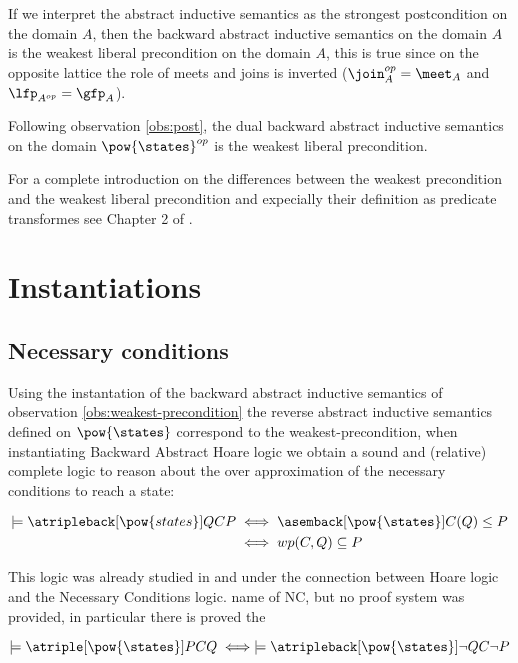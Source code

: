 If we interpret the abstract inductive semantics as the strongest postcondition
on the domain $A$, then the backward abstract inductive semantics on the domain 
$A$ is the weakest liberal precondition on the domain $A$, this is true since on 
the opposite lattice the role of meets and joins is inverted ($\join_A^{op} = 
\meet_A$ and $\lfp_{A^{op}} = \gfp_A$).

\begin{observation}
  \label{obs:weakest-liberal-precondition}
  Following observation \ref{obs:post}, the dual backward 
  abstract inductive semantics on the domain $\pow{\states}^{op}$ is the weakest 
  liberal precondition.
\end{observation}

For a complete introduction on the differences between the weakest precondition
and the weakest liberal precondition and expecially their definition as
predicate transformes see Chapter 2 of \cite{Kaminski19}.

\section{Instantiations}

\subsection{Necessary conditions}

Using the instantation of the backward abstract inductive semantics of 
observation \ref{obs:weakest-precondition} the reverse abstract inductive semantics
defined on $\pow{\states}$ correspond to the weakest-precondition, when 
instantiating Backward Abstract Hoare logic we obtain a sound and (relative) 
complete logic to reason about the over approximation of the necessary 
conditions to reach a state:

\begin{align*}
  \models \atripleback[\pow{states}]{Q}{C}{P} 
    & \iff \asemback[\pow{\states}]{C}(Q) \leq P \\
    & \iff wp(C, Q) \subseteq P
\end{align*}

This logic was already studied in \cite{Zhang22} and \cite{Ascari24} under the 
connection between Hoare logic and the Necessary Conditions logic.
name of NC, but no proof system was provided, in particular there is proved the 

\begin{theorem}
  $$\models \atriple[\pow{\states}]{P}{C}{Q} \iff \models \atripleback[\pow{\states}]{\neg Q}{C}
  {\neg P}$$
\end{theorem}

